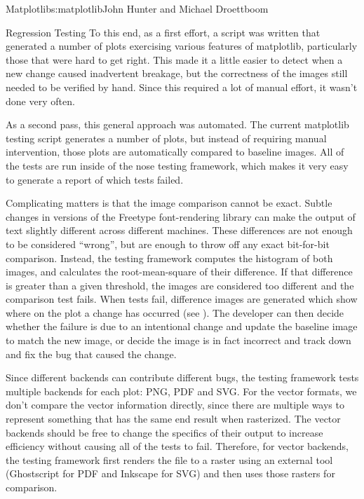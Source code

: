 \begin{aosachapter}{Matplotlib}{s:matplotlib}{John Hunter and Michael Droettboom}
\begin{aosasect1}{Regression Testing}
To this end, as a first effort, a script was written that generated a
number of plots exercising various features of matplotlib,
particularly those that were hard to get right.  This made it a little
easier to detect when a new change caused inadvertent breakage, but
the correctness of the images still needed to be verified by hand.
Since this required a lot of manual effort, it wasn't done very often.

As a second pass, this general approach was automated.  The current
matplotlib testing script generates a number of plots, but instead of
requiring manual intervention, those plots are automatically compared
to baseline images.  All of the tests are run inside of the nose
testing framework, which makes it very easy to generate a report of
which tests failed.

Complicating matters is that the image comparison cannot be exact.
Subtle changes in versions of the Freetype font-rendering library can
make the output of text slightly different across different machines.
These differences are not enough to be considered ``wrong'', but are
enough to throw off any exact bit-for-bit comparison.  Instead, the
testing framework computes the histogram of both images, and
calculates the root-mean-square of their difference.  If that
difference is greater than a given threshold, the images are
considered too different and the comparison test fails.  When tests
fail, difference images are generated which show where on the plot a
change has occurred (see ).  The
developer can then decide whether the failure is due to an intentional
change and update the baseline image to match the new image, or
decide the image is in fact incorrect and track down and fix the bug
that caused the change.


Since different backends can contribute different bugs, the testing
framework tests multiple backends for each plot: PNG, PDF and SVG.
For the vector formats, we don't compare the vector information
directly, since there are multiple ways to represent something that
has the same end result when rasterized.  The vector backends should
be free to change the specifics of their output to increase efficiency
without causing all of the tests to fail.  Therefore, for vector
backends, the testing framework first renders the file to a raster
using an external tool (Ghostscript for PDF and Inkscape for SVG) and
then uses those rasters for comparison.


\end{aosasect1}
\end{aosachapter}
